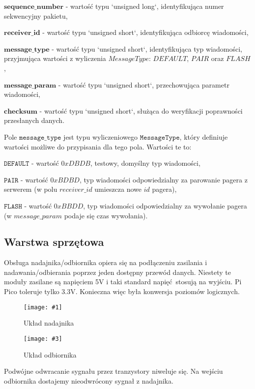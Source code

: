 \documentclass[12pt]{article}
\let\tempone\itemize
\let\temptwo\enditemize
\renewenvironment{itemize}{\tempone\setlength{\itemsep}{0cm}}{\temptwo}
\newcommand{\imgsidebyside}[4]{
	\begin{figure}[H]
		\centering
		\begin{minipage}{.45\textwidth}
			\centering
			\texttt{[image: \#1]}
			\caption{#2}
		\end{minipage}%
		\hfill
		\begin{minipage}{.45\textwidth}
			\centering
			\texttt{[image: \#3]}
			\caption{#4}
		\end{minipage}
	\end{figure}
}
\begin{document}
        \begin{itemize}
            \item $\mathbf{sequence\_number}$ - wartość typu `unsigned long`, identyfikująca numer sekwencyjny pakietu,
            \item $\mathbf{receiver\_id}$ - wartość typu `unsigned short`, identyfikująca odbiorcę wiadomości,
            \item $\mathbf{message\_type}$ - wartość typu `unsigned short`, identyfikująca typ wiadomości, przyjmująca wartości z wyliczenia $MessageType$: $DEFAULT$, $PAIR$ oraz $FLASH$,
            \item $\mathbf{message\_param}$ - wartość typu `unsigned short`, przechowująca parametr wiadomości,
            \item $\mathbf{checksum}$ - wartość typu `unsigned short`, służąca do weryfikacji poprawności przesłanych danych.
        \end{itemize}

        Pole $\texttt{message\_type}$ jest typu wyliczeniowego $\texttt{MessageType}$, który definiuje wartości możliwe do przypisania dla tego pola. Wartości te to:
        \begin{itemize}
            \item $\texttt{DEFAULT}$ - wartość $0xDBDB$, testowy, domyślny typ wiadomości,
            \item $\texttt{PAIR}$ - wartość $0xBDBD$, typ wiadomości odpowiedzialny za parowanie pagera z serwerem (w polu $receiver\_id$ umieszcza nowe $id$ pagera),
            \item $\texttt{FLASH}$ - wartość $0xBBDD$, typ wiadomości odpowiedzialny za wywołanie pagera (w $message\_param$ podaje się czas wywołania).
        \end{itemize}

		\subsection{Warstwa sprzętowa}
			Obsługa nadajnika/odbiornika opiera się na podłączeniu zasilania i nadawania/odbierania poprzez jeden dostępny przewód danych. Niestety te moduły zasilane są napięciem 5V i taki standard napięć stosują na wyjściu. Pi Pico toleruje tylko 3.3V. Konieczna więc była konwersja poziomów logicznych.

			\imgsidebyside{sch/tx}{Układ nadajnika}{sch/rx}{Układ odbiornika}

			Podwójne odwracanie sygnału przez tranzystory niweluje się. Na wejściu odbiornika dostajemy nieodwrócony sygnał z nadajnika.
\end{document}
